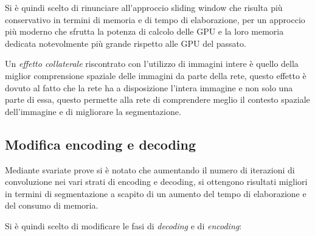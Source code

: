 Si è quindi scelto di rinunciare all'approccio sliding window che risulta più conservativo in termini di memoria e di tempo di elaborazione, per un approccio più moderno che sfrutta la potenza di calcolo delle GPU e la loro memoria dedicata notevolmente più grande rispetto alle GPU del passato.

Un \textit{effetto collaterale} riscontrato con l'utilizzo di immagini intere è quello della miglior comprensione spaziale delle immagini da parte della rete, questo effetto è dovuto al fatto che la rete ha a disposizione l'intera immagine e non solo una parte di essa, questo permette alla rete di comprendere meglio il contesto spaziale dell'immagine e di migliorare la segmentazione.



\subsection{Modifica encoding e decoding} %
\label{sub:Modifica encoding e decoding}
Mediante svariate prove si è notato che aumentando il numero di iterazioni di convoluzione nei vari strati di encoding e decoding, si ottengono risultati migliori in termini di segmentazione a scapito di un aumento del tempo di elaborazione e del consumo di memoria.

Si è quindi scelto di modificare le fasi di \textit{decoding} e di \textit{encoding}:


